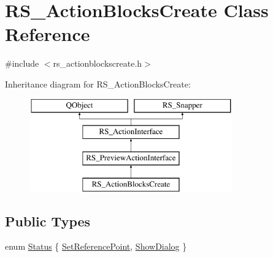 \hypertarget{classRS__ActionBlocksCreate}{\section{R\-S\-\_\-\-Action\-Blocks\-Create Class Reference}
\label{classRS__ActionBlocksCreate}
}


{\ttfamily \#include $<$rs\-\_\-actionblockscreate.\-h$>$}

Inheritance diagram for R\-S\-\_\-\-Action\-Blocks\-Create\-:\begin{figure}[H]
\begin{center}
\leavevmode
\includegraphics[height=4.000000cm]{classRS__ActionBlocksCreate}
\end{center}
\end{figure}
\subsection*{Public Types}
\begin{DoxyCompactItemize}
\item 
enum \hyperlink{classRS__ActionBlocksCreate_a5b9884424da6799084c3bdf518038e8b}{Status} \{ \hyperlink{classRS__ActionBlocksCreate_a5b9884424da6799084c3bdf518038e8ba0d7b5de72041963ca0aa5242ab8d9c6b}{Set\-Reference\-Point}, 
\hyperlink{classRS__ActionBlocksCreate_a5b9884424da6799084c3bdf518038e8baecf5986600cfd129cda2e667a843920f}{Show\-Dialog}
 \}
\end{DoxyCompactItemize}
